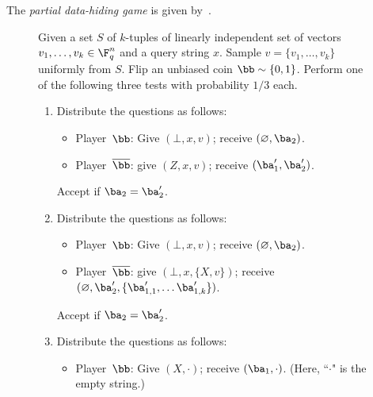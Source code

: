 

\begin{definition}\label{def:data-hide-def}
The \emph{partial data-hiding game} is given by~.
\end{definition}

{
\begin{figure}[htpb]
  Given a set $S$ of $k$-tuples of linearly independent set of vectors $v_1, \dots, v_k \in
  \F_q^{n}$ and a query string $x$. Sample $v = \{v_1, \dots, v_k\}$ uniformly from $S$.
  Flip an unbiased coin $\bb \sim \{0, 1\}$. Perform one of the following three tests with
  probability $1/3$ each.
  \begin{enumerate}
    \item Distribute the questions as follows:
      \begin{itemize}
      \item[$\circ$] Player~$\bb$: Give $(\bot, x,v)$; receive $(\varnothing, \ba_2)$.
      \item[$\circ$] Player~$\overline{\bb}$: give $(Z, x,v)$; receive
        $(\ba'_1, \ba'_2)$.
      \end{itemize}
      Accept if $\ba_2 = \ba_2'$.
    \item Distribute the questions as follows:
      \begin{itemize}
        \item[$\circ$] Player~$\bb$: Give $(\bot, x,v)$; receive $(\varnothing, \ba_2)$.
        \item[$\circ$] Player~$\overline{\bb}$: give $(\bot, x, \{X, v\})$; receive
        $(\varnothing, \ba'_2, \{\ba_{1,1}', \dots \ba_{1,k}'\})$. 
        \end{itemize}
        Accept if $\ba_2 = \ba_2'$.
      \item Distribute the questions as follows:
        \begin{itemize}
        \item[$\circ$] Player~$\bb$: Give $(X, \cdot)$; receive $(\ba_1, \cdot)$. (Here, ``$\cdot$" is the empty string.)

\end{itemize}
\end{enumerate}
\end{figure}}
